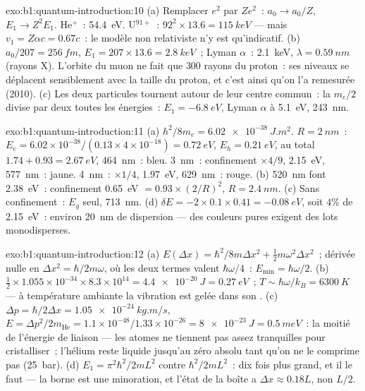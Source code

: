 \begin{solution}{exo:b1:quantum-introduction:10}
(a) Remplacer $e^2$ par $Ze^2$~: $a_0 \to a_0/Z$, $E_1 \to Z^2E_1$. He$^+$~:
\qty{54.4}{eV}. U$^{91+}$~: $92^2 \times 13.6 = \qty{115}{keV}$ --- mais $v_1 = Z\alpha c
= 0.67c$~: le modèle non relativiste n'y est qu'indicatif. (b) $a_0/207
= \qty{256}{fm}$, $E_1 = 207 \times 13.6 = \qty{2.8}{keV}$~; Lyman $\alpha$~:
\qty{2.1}{keV}, $\lambda = \qty{0.59}{nm}$ (rayons X). L'orbite du muon ne fait que
$300$ rayons du proton~: ses niveaux se déplacent sensiblement avec la taille
du proton, et c'est ainsi qu'on l'a remesurée (2010). (c) Les deux
particules tournent autour de leur centre commun~: la  $m_e/2$
divise par deux toutes les énergies~: $E_1 = \qty{-6.8}{eV}$, Lyman $\alpha$ à \qty{5.1}{eV}, \qty{243}{nm}.
\end{solution}

\begin{solution}{exo:b1:quantum-introduction:11}
(a) $h^2/8m_e = \qty{6.02e-38}{J.m^2}$. $R = \qty{2}{nm}$~: $E_e = 6.02 \times 10^{-38}/
(0.13 \times 4 \times 10^{-18}) = \qty{0.72}{eV}$, $E_h = \qty{0.21}{eV}$, au total $1.74 +
0.93 = \qty{2.67}{eV}$, \qty{464}{nm}~: bleu. \qty{3}{nm}~: confinement $\times4/9$,
\qty{2.15}{eV}, \qty{577}{nm}~: jaune. \qty{4}{nm}~: $\times1/4$, \qty{1.97}{eV},
\qty{629}{nm}~: rouge. (b) \qty{520}{nm} font \qty{2.38}{eV}~: confinement \qty{0.65}{eV}
$= 0.93 \times (2/R)^2$, $R = \qty{2.4}{nm}$. (c) Sans confinement~: $E_g$ seul,
\qty{713}{nm}. (d) $\delta E = -2 \times 0.1 \times 0.41 = \qty{-0.08}{eV}$, soit $4\%$ de
\qty{2.15}{eV}~: environ \qty{20}{nm} de dispersion --- des couleurs pures
exigent des lots monodisperses.
\end{solution}

\begin{solution}{exo:b1:quantum-introduction:12}
(a) $E(\Delta x) = \hbar^2/8m\Delta x^2 + \tfrac12m\omega^2\Delta x^2$~; dérivée nulle en
$\Delta x^2 = \hbar/2m\omega$, où les deux termes valent $\hbar\omega/4$~: $E_{\min} =
\hbar\omega/2$. (b) $\tfrac12 \times 1.055 \times 10^{-34} \times 8.3 \times 10^{14} = \qty{4.4e-20}{J}
= \qty{0.27}{eV}$~; $T \sim \hbar\omega/k_B = \qty{6300}{K}$ --- à température ambiante
la vibration est gelée dans son . (c) $\Delta p = \hbar/2\Delta x =
\qty{1.05e-24}{kg.m/s}$, $E = \Delta p^2/2m_{\mathrm{He}} = 1.1 \times 10^{-48}/1.33 \times
10^{-26} = \qty{8e-23}{J} = \qty{0.5}{meV}$~: la moitié de l'énergie de liaison ---
les atomes ne tiennent pas assez tranquilles pour cristalliser~; l'hélium
reste liquide jusqu'au zéro absolu tant qu'on ne le comprime pas
(\qty{25}{bar}). (d) $E_1 = \pi^2\hbar^2/2mL^2$ contre
$\hbar^2/2mL^2$~: dix fois plus grand, et il le faut --- la borne est une
minoration, et l'état de la boîte a $\Delta x \approx 0.18L$, non $L/2$.
\end{solution}

